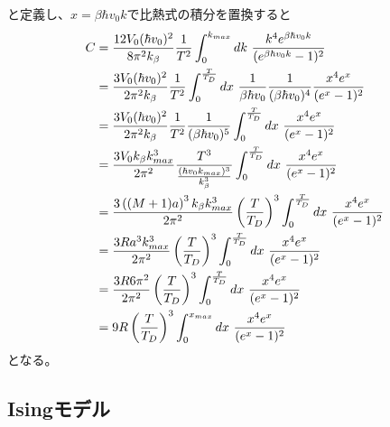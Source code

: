 \documentclass[dvipdfmx, 11pt, a4paper]{jsarticle}
\theoremstyle{definition}
\begin{document}
    と定義し、$x = \beta \hbar v_0 k$で比熱式の積分を置換すると
    \begin{align}
        C &= \frac{12V_0(\hbar v_0)^2}{8\pi^2 k_\beta} \frac{1}{T^2} \int_0^{k_{max}} dk\ \frac{k^4 e^{\beta \hbar v_0 k}}{(e^{\beta \hbar v_0 k} - 1)^2} \notag \\
        &= \frac{3V_0(\hbar v_0)^2}{2\pi^2 k_\beta} \frac{1}{T^2} \int_0^{\frac{T}{T_D}} dx\ \frac{1}{\beta \hbar v_0} \frac{1}{(\beta \hbar v_0)^4}\frac{ x^4e^x}{(e^x - 1)^2} \notag \\
        &= \frac{3V_0(\hbar v_0)^2}{2\pi^2 k_\beta} \frac{1}{T^2} \frac{1}{(\beta \hbar v_0)^5} \int_0^{\frac{T}{T_D}} dx\ \frac{ x^4e^x}{(e^x - 1)^2} \notag \\
        &= \frac{3V_0 k_\beta k_{max}^3}{2\pi^2} \frac{T^3}{\frac{(\hbar v_0 k_{max})^3}{k_\beta^3}} \int_0^{\frac{T}{T_D}} dx\ \frac{ x^4e^x}{(e^x - 1)^2} \notag \\ 
        &= \frac{3\left( {(M+1)a} \right)^3  k_\beta k_{max}^3}{2\pi^2} \left( \frac{T}{T_D} \right)^3 \int_0^{\frac{T}{T_D}} dx\ \frac{ x^4e^x}{(e^x - 1)^2} \notag \\
        &= \frac{3R a^3  k_{max}^3}{2\pi^2} \left( \frac{T}{T_D} \right)^3 \int_0^{\frac{T}{T_D}} dx\ \frac{ x^4e^x}{(e^x - 1)^2} \notag \\
        &= \frac{3R 6\pi^2}{2\pi^2} \left( \frac{T}{T_D} \right)^3 \int_0^{\frac{T}{T_D}} dx\ \frac{ x^4e^x}{(e^x - 1)^2} \notag \\
        &= 9R \left( \frac{T}{T_D} \right)^3 \int_0^{x_{max}} dx\ \frac{ x^4e^x}{(e^x - 1)^2} \notag 
    \end{align}
    となる。
\subsection{Isingモデル}
\end{document}
